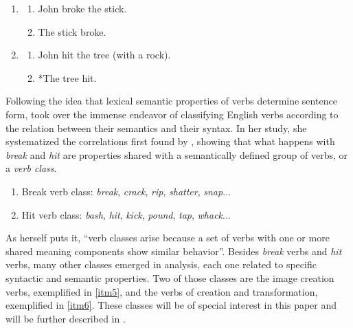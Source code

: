 \documentclass[english]{textolivre}
\begin{document}
\begin{enumerate}[label=(\arabic*)]
    \item \label{itm1}
    \begin{enumerate}[label=\alph*)]
        \item John broke the stick.
        \item The stick broke.
    \end{enumerate}
    \item \label{itm2}
    \begin{enumerate}[label=\alph*)]
        \item John hit the tree (with a rock).
        \item *The tree hit.
    \end{enumerate}
\end{enumerate}
\cite[p.~126-128]{fillmore_grammar_2003}

Following the idea that lexical semantic properties of verbs determine sentence form, \textcite{levin_english_1993} took over the immense endeavor of classifying English verbs according to the relation between their semantics and their syntax. In her study, she systematized the correlations first found by \textcite{fillmore_grammar_2003}, showing that what happens with \textit{break} and \textit{hit} are properties shared with a semantically defined group of verbs, or a \textit{verb class}.


\begin{enumerate}[label=(\arabic*),resume]
\item Break verb class: \textit{break}, \textit{crack}, \textit{rip}, \textit{shatter}, \textit{snap}...
\item Hit verb class: \textit{bash}, \textit{hit}, \textit{kick}, \textit{pound}, \textit{tap}, \textit{whack}...
\end{enumerate}
\cite[p.~7]{levin_english_1993}

As \textcite[p.~17]{levin_english_1993} herself puts it, “verb classes arise because a set of verbs with one or more shared meaning components show similar behavior”. Besides \textit{break} verbs and \textit{hit} verbs, many other classes emerged in  analysis, each one related to specific syntactic and semantic properties. Two of those classes are the image creation verbs, exemplified in \ref{itm5}, and the verbs of creation and transformation, exemplified in \ref{itm6}. These classes will be of special interest in this paper and will be further described in .
\end{document}
